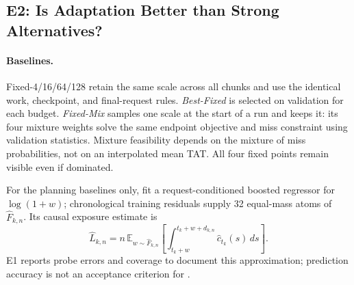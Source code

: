 \subsection{E2: Is Adaptation Better than Strong Alternatives?}

\paragraph{Baselines.}
Fixed-4/16/64/128 retain the same scale across all chunks and use the identical
work, checkpoint, and final-request rules. \emph{Best-Fixed} is selected on
validation for each budget. \emph{Fixed-Mix} samples one scale at the start of
a run and keeps it: its four mixture weights solve the same endpoint objective
and miss constraint using validation statistics. Mixture feasibility depends
on the mixture of miss probabilities, not on an interpolated mean TAT.
All four fixed points remain visible even if dominated.

For the planning baselines only, fit a request-conditioned boosted regressor
for $\log(1+w)$; chronological training residuals supply 32 equal-mass atoms
of $\widehat F_{k,n}$. Its causal exposure estimate is
\begin{equation}
 \widehat L_{k,n}=n\,\mathbb E_{w\sim\widehat F_{k,n}}
 \left[\int_{t_k+w}^{t_k+w+d_{k,n}}\widehat c_{t_k}(s)\,ds\right].
 \label{eq:forecast}
\end{equation}
E1 reports probe errors and coverage to document this approximation; prediction
accuracy is not an acceptance criterion for \name{}.

